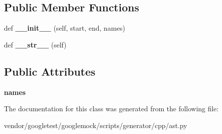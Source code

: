 \subsection*{Public Member Functions}
\begin{DoxyCompactItemize}
\item 
\mbox{\label{classcpp_1_1ast_1_1_using_a9b7a760a06d00f7211c889d9841e06af}} 
def {\bfseries \+\_\+\+\_\+init\+\_\+\+\_\+} (self, start, end, names)
\item 
\mbox{\label{classcpp_1_1ast_1_1_using_ac209e8e5d84988d14a8f4b30377e5455}} 
def {\bfseries \+\_\+\+\_\+str\+\_\+\+\_\+} (self)
\end{DoxyCompactItemize}
\subsection*{Public Attributes}
\begin{DoxyCompactItemize}
\item 
\mbox{\label{classcpp_1_1ast_1_1_using_abc05dedb59eb83857d373cc0e64eccb3}} 
{\bfseries names}
\end{DoxyCompactItemize}


The documentation for this class was generated from the following file\+:\begin{DoxyCompactItemize}
\item 
vendor/googletest/googlemock/scripts/generator/cpp/ast.\+py\end{DoxyCompactItemize}
